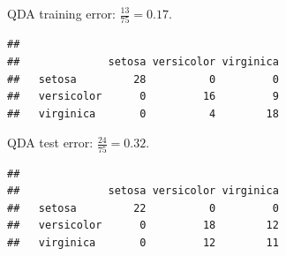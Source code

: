 \documentclass[
  10pt,
  ignorenonframetext,
]{beamer}
\newenvironment{Shaded}{\begin{snugshade}}{\end{snugshade}}
\newcommand{\AttributeTok}[1]{\textcolor[rgb]{0.13,0.29,0.53}{#1}}
\newcommand{\FunctionTok}[1]{\textcolor[rgb]{0.13,0.29,0.53}{\textbf{#1}}}
\newcommand{\NormalTok}[1]{#1}
\newcommand{\OtherTok}[1]{\textcolor[rgb]{0.56,0.35,0.01}{#1}}
\newcommand{\SpecialCharTok}[1]{\textcolor[rgb]{0.81,0.36,0.00}{\textbf{#1}}}
\begin{document}
\begin{frame}[fragile]
QDA training error: \(\frac{13}{75} =0.17\).

\scriptsize

\begin{Shaded}
\end{Shaded}

\begin{verbatim}
##             
##              setosa versicolor virginica
##   setosa         28          0         0
##   versicolor      0         16         9
##   virginica       0          4        18
\end{verbatim}

\normalsize

\vspace{2mm}

QDA test error: \(\frac{24}{75}=0.32\).

\scriptsize

\begin{Shaded}
\end{Shaded}

\begin{verbatim}
##             
##              setosa versicolor virginica
##   setosa         22          0         0
##   versicolor      0         18        12
##   virginica       0         12        11
\end{verbatim}
\end{frame}
\end{document}
